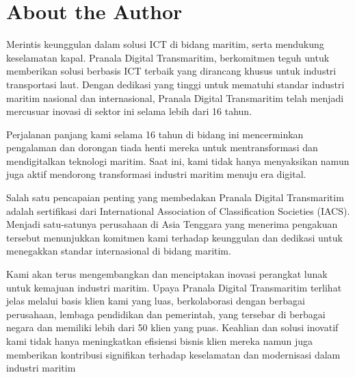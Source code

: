 \chapter{About the Author}

Merintis keunggulan dalam solusi ICT di bidang maritim, serta mendukung keselamatan kapal. Pranala Digital Transmaritim, berkomitmen teguh untuk memberikan solusi berbasis ICT terbaik yang dirancang khusus untuk industri transportasi laut. Dengan dedikasi yang tinggi untuk mematuhi standar industri maritim nasional dan internasional, Pranala Digital Transmaritim telah menjadi mercusuar inovasi di sektor ini selama lebih dari 16 tahun.

Perjalanan panjang kami selama 16 tahun di bidang ini mencerminkan pengalaman dan dorongan tiada henti mereka untuk mentransformasi dan mendigitalkan teknologi maritim. Saat ini, kami tidak hanya menyaksikan namun juga aktif mendorong transformasi industri maritim menuju era digital.

Salah satu pencapaian penting yang membedakan Pranala Digital Transmaritim adalah sertifikasi dari International Association of Classification Societies (IACS). Menjadi satu-satunya perusahaan di Asia Tenggara yang menerima pengakuan tersebut menunjukkan komitmen kami terhadap keunggulan dan dedikasi untuk menegakkan standar internasional di bidang maritim.

Kami akan terus mengembangkan dan menciptakan inovasi perangkat lunak untuk kemajuan industri maritim. Upaya Pranala Digital Transmaritim terlihat jelas melalui basis klien kami yang luas, berkolaborasi dengan berbagai perusahaan, lembaga pendidikan dan pemerintah, yang tersebar di berbagai negara dan memiliki lebih dari 50 klien yang puas. Keahlian dan solusi inovatif kami tidak hanya meningkatkan efisiensi bisnis klien mereka namun juga memberikan kontribusi signifikan terhadap keselamatan dan modernisasi dalam industri maritim




